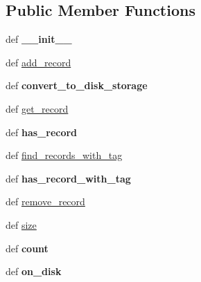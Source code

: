 \subsection*{Public Member Functions}
\begin{DoxyCompactItemize}
\item 
\hypertarget{classetl_1_1EtlRecordSet_1_1EtlRecordSet_add892dc0a0c458744ff3fd1cc5fc184b}{def {\bfseries \-\_\-\-\_\-init\-\_\-\-\_\-}}\label{classetl_1_1EtlRecordSet_1_1EtlRecordSet_add892dc0a0c458744ff3fd1cc5fc184b}

\item 
def \hyperlink{classetl_1_1EtlRecordSet_1_1EtlRecordSet_a7152530996477950371bd69e9da21298}{add\-\_\-record}
\item 
\hypertarget{classetl_1_1EtlRecordSet_1_1EtlRecordSet_a18701c73a7da83c098ad4b5cdc79741f}{def {\bfseries convert\-\_\-to\-\_\-disk\-\_\-storage}}\label{classetl_1_1EtlRecordSet_1_1EtlRecordSet_a18701c73a7da83c098ad4b5cdc79741f}

\item 
def \hyperlink{classetl_1_1EtlRecordSet_1_1EtlRecordSet_ab01685a2baef3ee4527c005f02122d37}{get\-\_\-record}
\item 
\hypertarget{classetl_1_1EtlRecordSet_1_1EtlRecordSet_aec9eb92e017bccdd3402515c079e8af6}{def {\bfseries has\-\_\-record}}\label{classetl_1_1EtlRecordSet_1_1EtlRecordSet_aec9eb92e017bccdd3402515c079e8af6}

\item 
def \hyperlink{classetl_1_1EtlRecordSet_1_1EtlRecordSet_ab9bfa74fe26ed32b1c6185cb8b7a42c7}{find\-\_\-records\-\_\-with\-\_\-tag}
\item 
\hypertarget{classetl_1_1EtlRecordSet_1_1EtlRecordSet_a51f38f33e821fd3313667b67f7df638d}{def {\bfseries has\-\_\-record\-\_\-with\-\_\-tag}}\label{classetl_1_1EtlRecordSet_1_1EtlRecordSet_a51f38f33e821fd3313667b67f7df638d}

\item 
def \hyperlink{classetl_1_1EtlRecordSet_1_1EtlRecordSet_aceadc74e6289bbe236ee369d5fdde291}{remove\-\_\-record}
\item 
def \hyperlink{classetl_1_1EtlRecordSet_1_1EtlRecordSet_a8bcedcafdc2bafd912eb289335ac129f}{size}
\item 
\hypertarget{classetl_1_1EtlRecordSet_1_1EtlRecordSet_ac7bda13fe8cd3ba9bdd8b3dd3ce6b840}{def {\bfseries count}}\label{classetl_1_1EtlRecordSet_1_1EtlRecordSet_ac7bda13fe8cd3ba9bdd8b3dd3ce6b840}

\item 
\hypertarget{classetl_1_1EtlRecordSet_1_1EtlRecordSet_a0f95a3a7a85b22f50e14ec3e29de83c7}{def {\bfseries on\-\_\-disk}}\label{classetl_1_1EtlRecordSet_1_1EtlRecordSet_a0f95a3a7a85b22f50e14ec3e29de83c7}

\end{DoxyCompactItemize}
